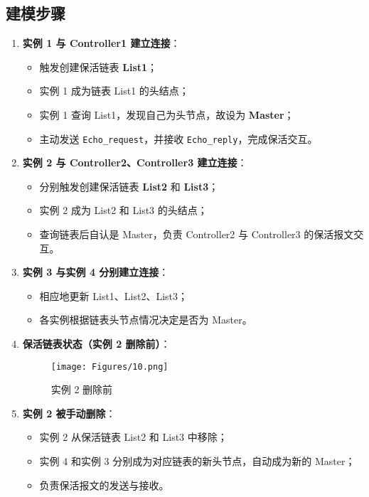 \documentclass{article}
\begin{document}
\subsection{\textbf{建模步骤}}

\begin{enumerate}
    \item \textbf{实例 1 与 Controller1 建立连接}：  
    \begin{itemize}
        \item 触发创建保活链表 \textbf{List1}；
        \item 实例 1 成为链表 List1 的头结点；
        \item 实例 1 查询 List1，发现自己为头节点，故设为 \textbf{Master}；
        \item 主动发送 \texttt{Echo\_request}，并接收 \texttt{Echo\_reply}，完成保活交互。
    \end{itemize}
    
    \item \textbf{实例 2 与 Controller2、Controller3 建立连接}：
    \begin{itemize}
        \item 分别触发创建保活链表 \textbf{List2} 和 \textbf{List3}；
        \item 实例 2 成为 List2 和 List3 的头结点；
        \item 查询链表后自认是 Master，负责 Controller2 与 Controller3 的保活报文交互。
    \end{itemize}

    \item \textbf{实例 3 与实例 4 分别建立连接}：  
    \begin{itemize}
        \item 相应地更新 List1、List2、List3；
        \item 各实例根据链表头节点情况决定是否为 Master。
    \end{itemize}

    \item \textbf{保活链表状态（实例 2 删除前）}：
    
    \begin{figure}[h]
    \centering
    \texttt{[image: Figures/10.png]}
    \caption{实例 2 删除前}
    \end{figure}
    
    
    

    \item \textbf{实例 2 被手动删除}：
    \begin{itemize}
        \item 实例 2 从保活链表 List2 和 List3 中移除；
        \item 实例 4 和实例 3 分别成为对应链表的新头节点，自动成为新的 Master；
        \item 负责保活报文的发送与接收。
    \end{itemize}


\end{enumerate}
\end{document}
